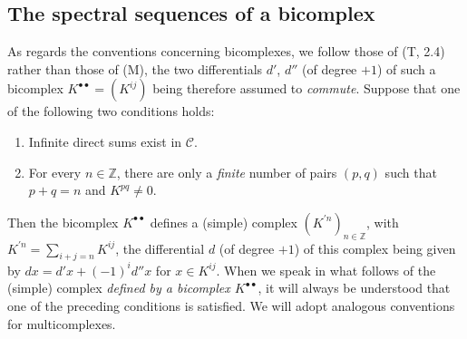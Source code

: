 \subsection{The spectral sequences of a bicomplex}
\label{subsection:0.11.3}

\begin{env}[11.3.1]
\label{0.11.3.1}
As regards the conventions concerning bicomplexes, we follow
those of (T, 2.4) rather than those of (M), the two differentials $d'$, $d''$
(of degree $+1$) of such a bicomplex
$K^{\bullet\bullet}=(K^{ij})$ being therefore assumed to \emph{commute}.
Suppose that one of the following two conditions holds:
\begin{enumerate}
  \item[$1^\circ$] Infinite direct sums exist in $\mathcal C$.
  \item[$2^\circ$] For every $n\in\mathbb Z$, there are only a
    \emph{finite} number of pairs $(p,q)$ such that $p+q=n$ and $K^{pq}\ne0$.
\end{enumerate}
Then the bicomplex $K^{\bullet\bullet}$ defines a (simple) complex
$(K^{\prime n})_{n\in\mathbb Z}$, with
$K^{\prime n}=\sum_{i+j=n}K^{ij}$, the differential $d$ (of degree
$+1$) of this complex being given by
$dx=d'x+(-1)^i d''x$ for $x\in K^{ij}$. When we speak in what follows
of the (simple) complex \emph{defined by a bicomplex $K^{\bullet\bullet}$}, it
will always be understood that one of the preceding conditions is satisfied.
We will adopt analogous conventions for multicomplexes.


\end{env}
